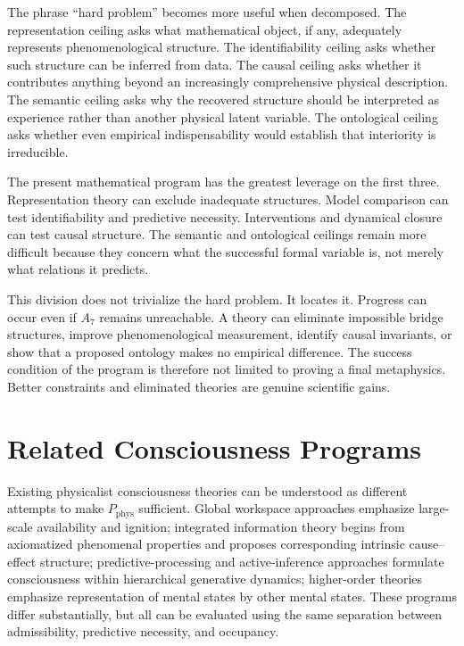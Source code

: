 The phrase ``hard problem'' becomes more useful when decomposed. The representation ceiling asks what mathematical object, if any, adequately represents phenomenological structure. The identifiability ceiling asks whether such structure can be inferred from data. The causal ceiling asks whether it contributes anything beyond an increasingly comprehensive physical description. The semantic ceiling asks why the recovered structure should be interpreted as experience rather than another physical latent variable. The ontological ceiling asks whether even empirical indispensability would establish that interiority is irreducible.

The present mathematical program has the greatest leverage on the first three. Representation theory can exclude inadequate structures. Model comparison can test identifiability and predictive necessity. Interventions and dynamical closure can test causal structure. The semantic and ontological ceilings remain more difficult because they concern what the successful formal variable is, not merely what relations it predicts.

This division does not trivialize the hard problem. It locates it. Progress can occur even if $A_7$ remains unreachable. A theory can eliminate impossible bridge structures, improve phenomenological measurement, identify causal invariants, or show that a proposed ontology makes no empirical difference. The success condition of the program is therefore not limited to proving a final metaphysics. Better constraints and eliminated theories are genuine scientific gains.

\section{Related Consciousness Programs}

Existing physicalist consciousness theories can be understood as different attempts to make $P_{\mathrm{phys}}$ sufficient. Global workspace approaches emphasize large-scale availability and ignition; integrated information theory begins from axiomatized phenomenal properties and proposes corresponding intrinsic cause--effect structure; predictive-processing and active-inference approaches formulate consciousness within hierarchical generative dynamics; higher-order theories emphasize representation of mental states by other mental states. These programs differ substantially, but all can be evaluated using the same separation between admissibility, predictive necessity, and occupancy.

